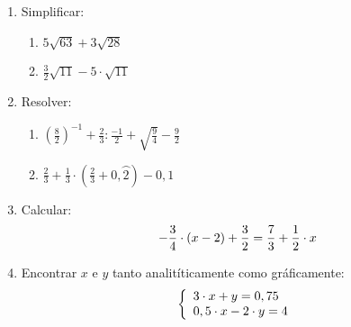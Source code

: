 \begin{enumerate}
\renewcommand{\labelenumi}{{\theenumi})}
\item Simplificar:
 \begin{enumerate}
    \item $5\sqrt{63}+3\sqrt{28}$
    \item $\frac{3}{2}\sqrt{11}-5\cdot \sqrt{11}$
   \end{enumerate}
\item Resolver:
    \begin{enumerate}
        \item $(\frac{8}{2})^{-1}+\frac{2}{3}:\frac{-1}{2}+\sqrt{\frac{9}{4}}-\frac{9}{2}$
        \item $\frac{2}{3}+\frac{1}{3}\cdot (\frac{2}{3}+0,\wideparen{2})-0,1$
     \end{enumerate}
\item Calcular:
    \begin{equation}
        \notag
        -\frac{3}{4}\cdot (x-2) +\frac{3}{2}=\frac{7}{3}+\frac{1}{2}\cdot x
    \end{equation}
\item Encontrar $x$ e $y$ tanto analitíticamente como gráficamente:
    \begin{equation}
    \notag
        \left\{ \begin{array}{lcc}
                 3\cdot x + y = 0,75
                 \\0,5\cdot x-2\cdot  y = 4
                 \end{array}
        \right.
    \end{equation}
\end{enumerate}
